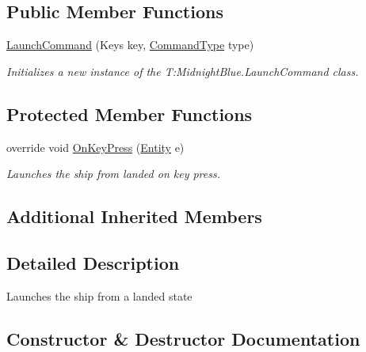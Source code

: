 \subsection*{Public Member Functions}
\begin{DoxyCompactItemize}
\item 
\hyperlink{class_midnight_blue_1_1_launch_command_af557e1d21514b76f8adb28fd5c43d279}{Launch\+Command} (Keys key, \hyperlink{namespace_midnight_blue_1_1_engine_1_1_i_o_a8bc3f159399ecadd590f7df1b54354b0}{Command\+Type} type)
\begin{DoxyCompactList}\small\item\em Initializes a new instance of the T\+:\+Midnight\+Blue.\+Launch\+Command class. \end{DoxyCompactList}\end{DoxyCompactItemize}
\subsection*{Protected Member Functions}
\begin{DoxyCompactItemize}
\item 
override void \hyperlink{class_midnight_blue_1_1_launch_command_a5da2fdd898111ea59f4f63126c380a3e}{On\+Key\+Press} (\hyperlink{class_midnight_blue_1_1_engine_1_1_entity_component_1_1_entity}{Entity} e)
\begin{DoxyCompactList}\small\item\em Launches the ship from landed on key press. \end{DoxyCompactList}\end{DoxyCompactItemize}
\subsection*{Additional Inherited Members}


\subsection{Detailed Description}
Launches the ship from a landed state 



\subsection{Constructor \& Destructor Documentation}
\hypertarget{class_midnight_blue_1_1_launch_command_af557e1d21514b76f8adb28fd5c43d279}{}\label{class_midnight_blue_1_1_launch_command_af557e1d21514b76f8adb28fd5c43d279} 
